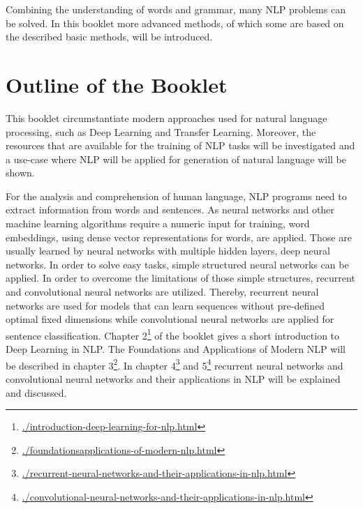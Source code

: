 \documentclass[]{krantz}
\renewcommand{\href}[2]{#2\footnote{\url{#1}}}
\begin{document}
Combining the understanding of words and grammar, many NLP problems can be solved. In this booklet more advanced methods, of which some are based on the described basic methods, will be introduced.

\hypertarget{outline-of-the-booklet}{%
\section{Outline of the Booklet}\label{outline-of-the-booklet}}

This booklet circumstantiate modern approaches used for natural language processing, such as Deep Learning and Transfer Learning. Moreover, the resources that are available for the training of NLP tasks will be investigated and a use-case where NLP will be applied for generation of natural language will be shown.

For the analysis and comprehension of human language, NLP programs need to extract information from words and sentences. As neural networks and other machine learning algorithms require a numeric input for training, word embeddings, using dense vector representations for words, are applied. Those are usually learned by neural networks with multiple hidden layers, deep neural networks. In order to solve easy tasks, simple structured neural networks can be applied. In order to overcome the limitations of those simple structures, recurrent and convolutional neural networks are utilized. Thereby, recurrent neural networks are used for models that can learn sequences without pre-defined optimal fixed dimensions while convolutional neural networks are applied for sentence classification.
Chapter \href{./introduction-deep-learning-for-nlp.html}{2} of the booklet gives a short introduction to Deep Learning in NLP. The Foundations and Applications of Modern NLP will be described in chapter \href{./foundationsapplications-of-modern-nlp.html}{3}. In chapter \href{./recurrent-neural-networks-and-their-applications-in-nlp.html}{4} and \href{./convolutional-neural-networks-and-their-applications-in-nlp.html}{5} recurrent neural networks and convolutional neural networks and their applications in NLP will be explained and discussed.
\end{document}
